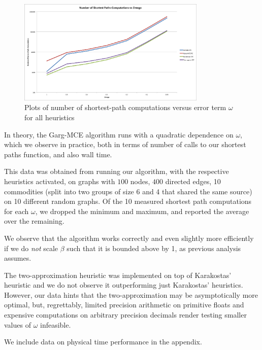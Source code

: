 \begin{figure}
\begin{center}
\mbox{\includegraphics[width=0.8\textwidth]{figures/omegas.png}}
\caption{Plots of number of shortest-path computations versus error
  term $\omega$ for all heuristics}
\end{center}
\end{figure}
In theory, the Garg-MCE algorithm runs with a quadratic dependence on $\omega$, which we observe in practice, both in
terms of number of calls to our shortest paths function, and also wall time.

This data was obtained from running our algorithm, with the respective heuristics activated, on graphs with $100$
nodes, $400$ directed edges, 10 commodities (split into two groups of
size 6 and 4 that shared the same source) on 10 different random
graphs. Of the 10 measured shortest path computations for each
$\omega$, we dropped the minimum and maximum, and reported the average over the remaining.

We observe that the algorithm works correctly and even slightly more efficiently if we do \emph{not} scale $\beta$ such
that it is bounded above by 1, as previous analysis assumes.

The two-approximation heuristic was implemented on top of Karakostas' heuristic and we do not observe it outperforming
just Karakostas' heuristics. However, our data hints that the two-approximation may be asymptotically more optimal,
but, regrettably, limited precision arithmetic on primitive floats and expensive computations on arbitrary precision
decimals render testing smaller values of $\omega$ infeasible.

We include data on physical time performance in the appendix.

